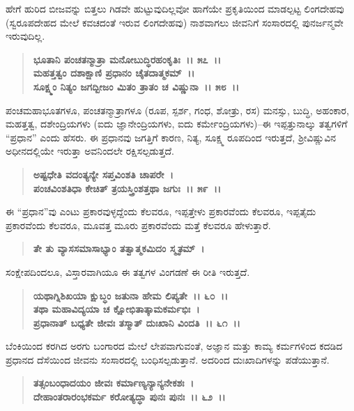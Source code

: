 ಹೇಗೆ ಹುರಿದ ಬೀಜವನ್ನು ಬಿತ್ತಲು ಗಿಡವೇ ಹುಟ್ಟುವುದಿಲ್ಲವೋ ಹಾಗೆಯೇ ಪ್ರಕೃತಿಯಿಂದ ಮಾಡಲ್ಪಟ್ಟ ಲಿಂಗದೇಹವು (ಸ್ವರೂಪದೇಹದ ಮೇಲೆ ಕವಚದಂತೆ ಇರುವ ಲಿಂಗದೇಹವು) ನಾಶವಾಗಲು ಜೀವನಿಗೆ ಸಂಸಾರದಲ್ಲಿ ಪುನರ್ಜನ್ಮವೇ ಇರುವುದಿಲ್ಲ.

\begin{verse}
\textbf{ಭೂತಾನಿ ಪಂಚತನ್ಮಾತ್ರಾ ಮನೋಬುದ್ಧಿರಹಂಕೃತಿಃ~।। ೫೭~।।}\\\textbf{ಮಹತ್ತತ್ವಂ ದಶಾಕ್ಷಾಣಿ ಪ್ರಧಾನಂ ಚೈತದಾತ್ಮಕಮ್~।। }\\\textbf{ಸೂಕ್ಷ್ಮಂ ನಿತ್ಯಂ ಜಗದ್ಬೀಜಂ ಮಿತಂ ತ್ರಾತಂ ಚ ವಿಷ್ಣುನಾ~।। ೫೮~।।}
\end{verse}

ಪಂಚಮಹಾಭೂತಗಳೂ, ಪಂಚತನ್ಮಾತ್ರಾಗಳೂ (ರೂಪ, ಸ್ಪರ್ಶ, ಗಂಧ, ಶೋತ್ರು, ರಸ) ಮನಸ್ಸು, ಬುದ್ಧಿ, ಅಹಂಕಾರ, ಮಹತ್ತತ್ವ, ದಶೇಂದ್ರಿಯಗಳು (ಐದು ಜ್ಞಾನೇಂದ್ರಿಯಗಳು, ಐದು ಕರ್ಮೇಂದ್ರಿಯಗಳು)–ಈ ಇಪ್ಪತ್ತುನಾಲ್ಕು ತತ್ವಗಳಿಗೆ “ಪ್ರಧಾನ” ಎಂದು ಹೆಸರು. ಈ ಪ್ರಧಾನವು ಜಗತ್ತಿಗೆ ಕಾರಣ, ನಿತ್ಯ, ಸೂಕ್ಷ್ಮ ರೂಪದಿಂದ ಇರುತ್ತದೆ, ಶ‍್ರೀವಿಷ್ಣುವಿನ ಅಧೀನದಲ್ಲಿಯೇ ಇರುತ್ತಾ ಅವನಿಂದಲೇ ರಕ್ಷಿಸಲ್ಪಡುತ್ತದೆ.

\begin{verse}
\textbf{ಅಷ್ಟಧೇತಿ ವದಂತ್ಯನ್ಯೇ ಸಪ್ತವಿಂಶತಿ ಚಾಪರೇ~।}\\\textbf{ಪಂಚವಿಂಶತಿಧಾ ಕೇಚಿತ್ ತ್ರಯಸ್ತ್ರಿಂಶತ್ತಥಾ ಜಗುಃ~।। ೫೯~।।}
\end{verse}

ಈ “ಪ್ರಧಾನ”ವು ಎಂಟು ಪ್ರಕಾರವುಳ್ಳದ್ದೆಂದು ಕೆಲವರೂ, ಇಪ್ಪತ್ತೇಳು ಪ್ರಕಾರವೆಂದು ಕೆಲವರೂ, ಇಪ್ಪತೈದು ಪ್ರಕಾರವೆಂದು ಕೆಲವರೂ, ಮೂವತ್ತ ಮೂರು ಪ್ರಕಾರವೆಂದು ಮತ್ತೆ ಕೆಲವರೂ ಹೇಳುತ್ತಾರೆ.

\begin{verse}
\textbf{ತೇ ತು ವ್ಯಾಸಸಮಾಸಾಭ್ಯಾಂ ತತ್ವಾತ್ಮಕಮಿದಂ ಸ್ಮೃತಮ್~।}
\end{verse}

ಸಂಕ್ಷೇಪದಿಂದಲೂ, ವಿಸ್ತಾರವಾಗಿಯೂ ಈ ತತ್ವಗಳ ವಿಂಗಡಣೆ ಈ ರೀತಿ ಇರುತ್ತದೆ.

\begin{verse}
\textbf{ಯಥಾಗ್ನಿಶಿಖಯಾ ಕ್ಷುಬ್ಧಂ ಜತುನಾ ಹೇಮ ಲಿಪ್ಯತೇ~।। ೬೦~।।}\\\textbf{ತಥಾ ಮಹಾವಿದ್ಯಯಾ ಚ ಕ್ಷೋಭಿತಾತ್ಕಾಮಕರ್ಮಭಿಃ~।}\\\textbf{ಪ್ರಧಾನಾತ್ ಬಧ್ಯತೇ ಜೀವಃ ತಸ್ಮಾತ್ ದುಃಖಾನಿ ವಿಂದತಿ~।। ೬೧~।।}
\end{verse}

ಬೆಂಕಿಯಿಂದ ಕರಗಿದ ಅರಗು ಬಂಗಾರದ ಮೇಲೆ ಲೇಪವಾಗುವಂತೆ, ಅಜ್ಞಾನ ಮತ್ತು ಕಾಮ್ಯ ಕರ್ಮಗಳಿಂದ ಕದಡಿದ ಪ್ರಧಾನದ ದೆಸೆಯಿಂದ ಜೀವನು ಸಂಸಾರದಲ್ಲಿ ಬಂಧಿಸಲ್ಪಡು\-ತ್ತಾನೆ. ಅದರಿಂದ ದುಃಖಾದಿಗಳನ್ನು ಪಡೆಯುತ್ತಾನೆ.

\begin{verse}
\textbf{ತತ್ಸಂಬಂಧಾದಯಂ ಜೀವಃ ಕರ್ಮಾಣ್ಯನ್ಯಾನ್ಯನೇಕಶಃ~।}\\\textbf{ದೇಹಾಂತರಾರಂಭಕರ್ಮ ಕರೋತ್ಯದ್ಧಾ ಪುನಃ ಪುನಃ~।। ೬೨~।।}
\end{verse}

